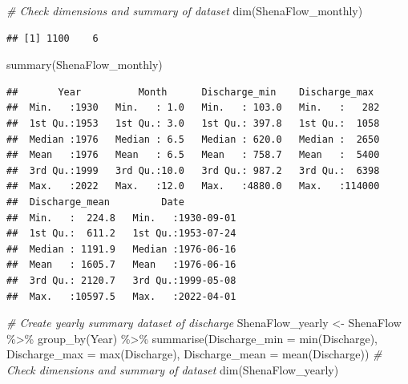 \documentclass[
  12pt,
]{article}
\newenvironment{Shaded}{\begin{snugshade}}{\end{snugshade}}
\newcommand{\AttributeTok}[1]{\textcolor[rgb]{0.77,0.63,0.00}{#1}}
\newcommand{\CommentTok}[1]{\textcolor[rgb]{0.56,0.35,0.01}{\textit{#1}}}
\newcommand{\FunctionTok}[1]{\textcolor[rgb]{0.00,0.00,0.00}{#1}}
\newcommand{\NormalTok}[1]{#1}
\newcommand{\OtherTok}[1]{\textcolor[rgb]{0.56,0.35,0.01}{#1}}
\newcommand{\SpecialCharTok}[1]{\textcolor[rgb]{0.00,0.00,0.00}{#1}}
\begin{document}
\begin{Shaded}
\begin{Highlighting}[]
\CommentTok{\# Check dimensions and summary of dataset}
\FunctionTok{dim}\NormalTok{(ShenaFlow\_monthly)}
\end{Highlighting}
\end{Shaded}

\begin{verbatim}
## [1] 1100    6
\end{verbatim}

\begin{Shaded}
\begin{Highlighting}[]
\FunctionTok{summary}\NormalTok{(ShenaFlow\_monthly)}
\end{Highlighting}
\end{Shaded}

\begin{verbatim}
##       Year          Month      Discharge_min    Discharge_max   
##  Min.   :1930   Min.   : 1.0   Min.   : 103.0   Min.   :   282  
##  1st Qu.:1953   1st Qu.: 3.0   1st Qu.: 397.8   1st Qu.:  1058  
##  Median :1976   Median : 6.5   Median : 620.0   Median :  2650  
##  Mean   :1976   Mean   : 6.5   Mean   : 758.7   Mean   :  5400  
##  3rd Qu.:1999   3rd Qu.:10.0   3rd Qu.: 987.2   3rd Qu.:  6398  
##  Max.   :2022   Max.   :12.0   Max.   :4880.0   Max.   :114000  
##  Discharge_mean         Date           
##  Min.   :  224.8   Min.   :1930-09-01  
##  1st Qu.:  611.2   1st Qu.:1953-07-24  
##  Median : 1191.9   Median :1976-06-16  
##  Mean   : 1605.7   Mean   :1976-06-16  
##  3rd Qu.: 2120.7   3rd Qu.:1999-05-08  
##  Max.   :10597.5   Max.   :2022-04-01
\end{verbatim}

\begin{Shaded}
\begin{Highlighting}[]
\CommentTok{\# Create yearly summary dataset of discharge}
\NormalTok{ShenaFlow\_yearly }\OtherTok{\textless{}{-}}\NormalTok{ ShenaFlow }\SpecialCharTok{\%\textgreater{}\%}
  \FunctionTok{group\_by}\NormalTok{(Year) }\SpecialCharTok{\%\textgreater{}\%}
  \FunctionTok{summarise}\NormalTok{(}\AttributeTok{Discharge\_min =} \FunctionTok{min}\NormalTok{(Discharge),}
            \AttributeTok{Discharge\_max =} \FunctionTok{max}\NormalTok{(Discharge),}
            \AttributeTok{Discharge\_mean =} \FunctionTok{mean}\NormalTok{(Discharge))}
\CommentTok{\# Check dimensions and summary of dataset}
\FunctionTok{dim}\NormalTok{(ShenaFlow\_yearly)}
\end{Highlighting}
\end{Shaded}
\end{document}
